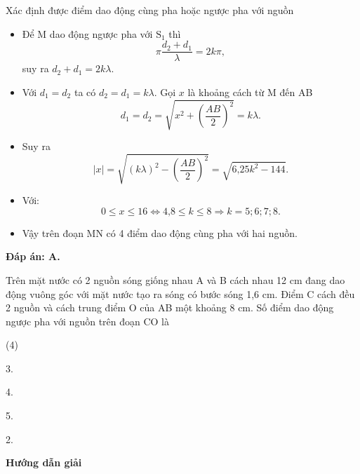 \begin{dang}{Xác định được điểm dao động cùng pha hoặc ngược pha với nguồn}
{\begin{itemize}
			\begin{equation*}
				u_{\text{M}} = 2a \cos \left(\pi \dfrac{d_2-d_1}{\lambda}\right) \cos \left( 20\pi t - \pi \dfrac{d_2+d_1}{\lambda}\right).
			\end{equation*}
			\item Để M dao động ngược pha với $\text{S}_1$ thì
			\begin{equation*}
				\pi \dfrac{d_2+d_1}{\lambda} =2k\pi,
			\end{equation*}
			suy ra $d_2+d_1=2k\lambda$.
			\item Với $d_1=d_2$ ta có $d_2=d_1=k\lambda$.
			Gọi $x$ là khoảng cách từ M đến AB 
			\begin{equation*}
				d_1=d_2 =\sqrt {x^2 + \left(\dfrac{AB}{2}\right)^2} =k\lambda. 
			\end{equation*}
			\item Suy ra 
			\begin{equation*}
				|x|=\sqrt {(k\lambda)^2 - \left(\dfrac{AB}{2}\right)^2}=\sqrt {\text{6,25}k^2-144}.
			\end{equation*}
			\item Với:
			\begin{equation*}
				0 \leq x \leq 16 \Leftrightarrow \text{4,8} \leq k \leq 8 \Rightarrow k=5; 6; 7; 8.
			\end{equation*}
			\item Vậy trên đoạn MN có 4 điểm dao động cùng pha với hai nguồn.
		\end{itemize}
		
		\textbf{Đáp án: A.}
	}
	{Trên mặt nước có 2 nguồn sóng giống nhau A và B cách nhau 12 cm đang dao động vuông góc với mặt nước tạo ra sóng có bước sóng 1,6 cm. Điểm C cách đều 2 nguồn và cách trung điểm O của AB một khoảng 8 cm. Số điểm dao động ngược pha với nguồn trên đoạn CO là
		
		\begin{mcq}(4)
			\item 3.
			\item 4.
			\item 5.
			\item 2.
		\end{mcq}
	}
	{\begin{center}
			\textbf{Hướng dẫn giải}
			

\end{center}}
\end{dang}

